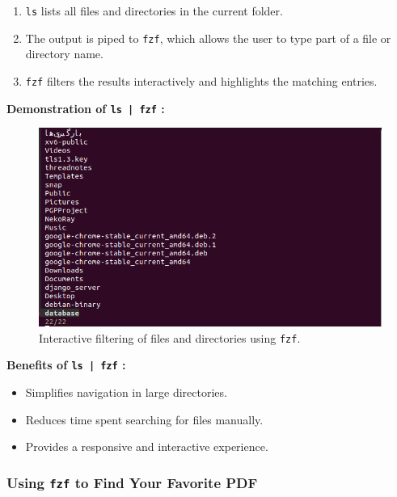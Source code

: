 \documentclass[12pt]{article}
\begin{document}
            \begin{enumerate}
                \item \texttt{ls} lists all files and directories in the current folder.
                \item The output is piped to \texttt{fzf}, which allows the user to type part of a file or directory name.
                \item \texttt{fzf} filters the results interactively and highlights the matching entries.
            \end{enumerate}

            \newpage
            \textbf{Demonstration of \texttt{ls | fzf} :}

            \begin{figure}[H]
                \centering
                \includegraphics[width=\textwidth]{assets/pictures/filtering_using_fzf.png}
                \caption{Interactive filtering of files and directories using \texttt{fzf}.}
            \end{figure}

            \textbf{Benefits of \texttt{ls | fzf} :}
            \begin{itemize}
                \item Simplifies navigation in large directories.
                \item Reduces time spent searching for files manually.
                \item Provides a responsive and interactive experience.
            \end{itemize}

            
            \subsubsection{Using \texttt{fzf} to Find Your Favorite PDF}
\end{document}
